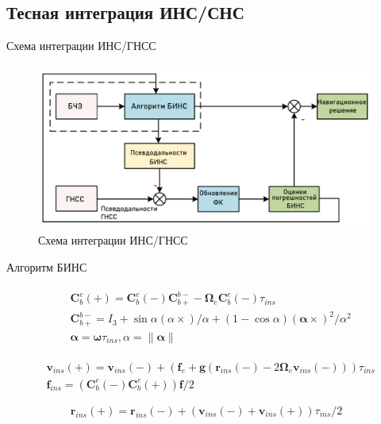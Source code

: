 \documentclass[aspectratio=43,display]{beamer}
\begin{document}
\subsection{Тесная интеграция ИНС/СНС}
\begin{frame}{Схема интеграции ИНС/ГНСС}
	\begin{figure}
		\includegraphics[width=1.0\linewidth]{integration.png}
		\caption{\label{fig:cluster_pcb} Схема интеграции ИНС/ГНСС}
	\end{figure}
\end{frame}


\begin{frame}{Алгоритм БИНС}

\begin{fleqn}
\begin{equation} \label{eq:tr_mat}
	\begin{gathered}
	\begin{split}
		& \bm C_b^e(+) = \bm C_b^e(-) \bm C_{b+}^{b-} - \bm \Omega_e \bm C_b^e(-) \tau_{ins} \\
		&  \bm C_{b+}^{b-} = I_3 + \sin \alpha (\alpha \times) / \alpha + (1 - \cos \alpha )(\bm \alpha \times)^2 / \alpha^2 \\ 
		& \bm \alpha =  \bm \omega\tau_{ins}, \alpha = \parallel \bm \alpha \parallel
	\end{split}
	\end{gathered}
\end{equation}

\begin{equation}
	\label{eq:vel}
	\begin{split}
			& \bm v_{ins} (+) = \bm v_{ins}(-) + (\bm f_e + \bm g (\bm r_{ins}(-) - 2 \bm \Omega_e \bm v_{ins} (-) ) )  \tau_{ins} \\
			& \bm f_{ins} = (\bm C_b^e(-) \bm C_b^e(+)) \bm f / 2
	\end{split}
\end{equation}	

\begin{equation}
	\label{eq:vel}
		\bm r_{ins}(+) = \bm r_{ins}(-) + (\bm v_{ins}(-) + \bm v_{ins}(+)) \tau_{ins}/2
\end{equation}
\end{fleqn}
\end{frame}
\end{document}
